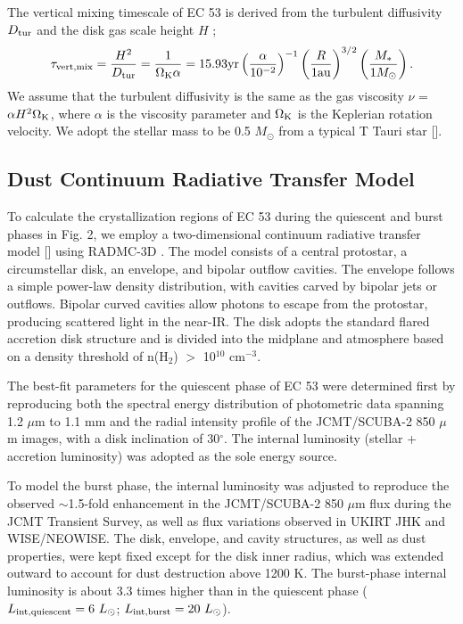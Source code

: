 \documentclass[pdflatex,sn-mathphys-num]{sn-jnl}
\theoremstyle{thmstyleone}
\theoremstyle{thmstyletwo}
\theoremstyle{thmstylethree}
\begin{document}
\begin{bibunit}
The vertical mixing timescale of EC 53 is derived from the turbulent diffusivity $D_{\rm tur}$ and the disk gas scale height $H$ \citep{Klarmann2018};
\begin{equation*}
\tau_{\rm vert,mix} = \frac{H^{2}}{D_{\rm tur}} = \frac{1}{\Omega_{\rm K}\alpha} = 15.93 {\rm yr} \left(\frac{\alpha}{10^{-2}}\right)^{-1} \left(\frac{R}{1 \rm au}\right)^{3/2} \left(\frac{M_{*}}{1 M_{\odot}}\right).
\end{equation*}
We assume that the turbulent diffusivity is the same as the gas viscosity $\nu$ = $\alpha H^{2}\Omega_{\rm K} $, where $\alpha$ is the viscosity parameter and $\Omega_{\rm K}$ is the Keplerian rotation velocity. We adopt the stellar mass to be 0.5 $M_{\odot}$ from a typical T Tauri star [].

\subsection{Dust Continuum Radiative Transfer Model}
To calculate the crystallization regions of EC 53 during the quiescent and burst phases in Fig. 2, we employ a two-dimensional continuum radiative transfer model [] using RADMC-3D \citep{Dullemond2012}. The model consists of a central protostar, a circumstellar disk, an envelope, and bipolar outflow cavities. The envelope follows a simple power-law density distribution, with cavities carved by bipolar jets or outflows. Bipolar curved cavities allow photons to escape from the protostar, producing scattered light in the near-IR. The disk adopts the standard flared accretion disk structure and is divided into the midplane and atmosphere based on a density threshold of n(H${_2}$) $>$ 10$^{10}$ cm$^{-3}$.

The best-fit parameters for the quiescent phase of EC 53 were determined first by reproducing both the spectral energy distribution of photometric data spanning 1.2 $\mu$m to 1.1 mm and the radial intensity profile of the JCMT/SCUBA-2 850 $\mu$m images, with a disk inclination of 30$^{\circ}$. The internal luminosity (stellar + accretion luminosity) was adopted as the sole energy source.

To model the burst phase, the internal luminosity was adjusted to reproduce the observed $\sim$1.5-fold enhancement in the JCMT/SCUBA-2 850 $\mu$m flux during the JCMT Transient Survey, as well as flux variations observed in UKIRT JHK and WISE/NEOWISE. The disk, envelope, and cavity structures, as well as dust properties, were kept fixed except for the disk inner radius, which was extended outward to account for dust destruction above 1200 K. The burst-phase internal luminosity is about 3.3 times higher than in the quiescent phase ($L_{\rm int,quiescent}=6~L_\odot$; $L_{\rm int,burst}=20~L_\odot$).


\end{bibunit}
\end{document}
